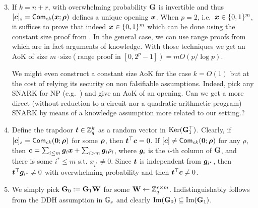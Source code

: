 \begin{enumerate}[label=(\alph*)]
\setcounter{enumi}{2}
\item If $k=n+r$, with overwhelming probability $\mathbf{{G}}$ is invertible and thus $[{\boldsymbol{c}}]_s=\mathsf{Com}_{ck}({\boldsymbol{x}};{\boldsymbol{\rho}})$ defines a unique opening ${\boldsymbol{x}}$. When $p=2$, i.e.~${\boldsymbol{x}}\in\{0,1\}^m$, it suffices to prove that indeed ${\boldsymbol{x}}\in\{0,1\}^m$ which can be done using the constant size proof from \cite{AC:GonHevRaf15}. In the general case, we can use range proofs from \cite{ACNS:GonRaf16} which are in fact arguments of knowledge. With those techniques we get an AoK of size $m\cdot\mathrm{size}(\text{range proof in }[0,2^p-1])=mO(p/\log p)$.

We might even construct a constant size AoK for the case $k=O(1)$ but at the cost of relying its security on non falsifiable assumptions. Indeed, pick any SNARK for NP (e.g.~\cite{EC:Groth16}) and give an AoK of an opening. {\color{red} Can we get a more direct (without reduction to a circuit nor a quadratic arithmetic program) SNARK by means of a knowledge assumption more related to our setting.?}
\item Define the trapdoor ${\boldsymbol{t}}\in\mathbb{Z}_q^k$ as a random vector in $\mathrm{Ker}(\mathbf{{G}}_1^\top)$. 
Clearly, if $[{\boldsymbol{c}}]_s=\mathsf{Com}_{ck}({\boldsymbol{0}};{\boldsymbol{\rho}})$ for some ${\boldsymbol{\rho}}$, then ${\boldsymbol{t}}^\top{\boldsymbol{c}}=0$. If $[{\boldsymbol{c}}]\neq\mathsf{Com}_{ck}({\boldsymbol{0}};{\boldsymbol{\rho}})$ for any $\rho$, then ${\boldsymbol{c}}=\sum_{i\leq m}{\boldsymbol{g}}_i{\boldsymbol{x}}+\sum_{i>m}{\boldsymbol{g}}_i\rho_i$, where ${\boldsymbol{g}}_i$ is the $i$-th column of $\mathbf{{G}}$, and there is some $i^*\leq m$ s.t. $x_{i^*}\neq 0$. Since ${\boldsymbol{t}}$ is independent from ${\boldsymbol{g}}_{i^*}$, then ${\boldsymbol{t}}^\top{\boldsymbol{g}}_{i^*}\neq 0$ with overwhelming probability and then ${\boldsymbol{t}}^\top{\boldsymbol{c}}\neq 0$. 
\item We simply pick $\mathbf{{G}}_0:=\mathbf{{G}}_1\mathbf{{W}}$ for some $\mathbf{{W}}\gets\mathbb{Z}_q^{r\times m}$. Indistinguishably follows from the DDH assumption in $\mathbb{G}_s$ and clearly $\mathrm{Im}(\mathbf{{G}}_0)\subseteq\mathrm{Im}(\mathbf{{G}}_1)$.
\end{enumerate}

